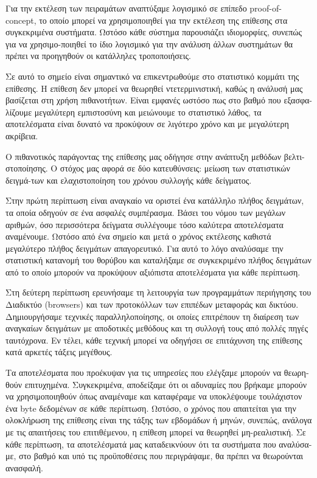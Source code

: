 Για την εκτέλεση των πειραμάτων αναπτύξαμε λογισμικό σε επίπεδο
proof-of-concept, το οποίο μπορεί να χρησιμοποιηθεί για την εκτέλεση της
επίθεσης στα συγκεκριμένα συστήματα. Ωστόσο κάθε σύστημα παρουσιάζει
ιδιομορφίες, συνεπώς για να χρησιμο-ποιηθεί το ίδιο λογισμικό για την ανάλυση
άλλων συστημάτων θα πρέπει να προηγηθούν οι κατάλληλες τροποποιήσεις.

Σε αυτό το σημείο είναι σημαντικό να επικεντρωθούμε στο στατιστικό κομμάτι της
επίθεσης. Η επίθεση δεν μπορεί να θεωρηθεί ντετερμινιστική, καθώς η ανάλυσή μας
βασίζεται στη χρήση πιθανοτήτων. Είναι εμφανές ωστόσο πως στο βαθμό που
εξασφα-λίζουμε μεγαλύτερη εμπιστοσύνη και μειώνουμε το στατιστικό λάθος, τα
αποτελέσματα είναι δυνατό να προκύψουν σε λιγότερο χρόνο και με μεγαλύτερη
ακρίβεια.

Ο πιθανοτικός παράγοντας της επίθεσης μας οδήγησε στην ανάπτυξη μεθόδων
βελτι-στοποίησης. Ο στόχος μας αφορά σε δύο κατευθύνσεις: μείωση των στατιστικών
δειγμά-των και ελαχιστοποίηση του χρόνου συλλογής κάθε δείγματος.

Στην πρώτη περίπτωση είναι αναγκαίο να οριστεί ένα κατάλληλο πλήθος δειγμάτων,
τα οποία οδηγούν σε ένα ασφαλές συμπέρασμα. Βάσει του νόμου των μεγάλων αριθμών,
όσο περισσότερα δείγματα συλλέγουμε τόσο καλύτερα αποτελέσματα αναμένουμε.
Ωστόσο από ένα σημείο και μετά ο χρόνος εκτέλεσης καθιστά μεγαλύτερο πλήθος
δειγμάτων απαγορευτικό. Για αυτό το λόγο αναλύσαμε την στατιστική κατανομή του
θορύβου και καταλήξαμε σε συγκεκριμένο πλήθος δειγμάτων από το οποίο μπορούν να
προκύψουν αξιόπιστα αποτελέσματα για κάθε περίπτωση.

Στη δεύτερη περίπτωση ερευνήσαμε τη λειτουργία των προγραμμάτων περιήγησης του
Διαδικτύο (browsers) και των προτοκόλλων των επιπέδων μεταφοράς και δικτύου.
Δημιουργήσαμε τεχνικές παραλληλοποίησης, οι οποίες επιτρέπουν τη διαίρεση των
αναγκαίων δειγμάτων με αποδοτικές μεθόδους και τη συλλογή τους από πολλές πηγές
ταυτόχρονα. Εν τέλει, κάθε τεχνική μπορεί να οδηγήσει σε επιτάχυνση της επίθεσης
κατά αρκετές τάξεις μεγέθους.

Τα αποτελέσματα που προέκυψαν για τις υπηρεσίες που ελέγξαμε μπορούν να
θεωρη-θούν επιτυχημένα. Συγκεκριμένα, αποδείξαμε ότι οι αδυναμίες που βρήκαμε
μπορούν να χρησιμοποιηθούν όπως αναμέναμε και καταφέραμε να υποκλέψουμε
τουλάχιστον ένα byte δεδομένων σε κάθε περίπτωση. Ωστόσο, ο χρόνος που
απαιτείται για την ολοκλήρωση της επίθεσης είναι της τάξης των εβδομάδων ή
μηνών, συνεπώς, ανάλογα με τις απαιτήσεις του επιτιθέμενου, η επίθεση μπορεί να
θεωρηθεί μη-ρεαλιστική. Σε κάθε περίπτωση, τα αποτελέσματά μας καταδεικνύουν ότι
τα συστήματα που αναλύσα-με, στο βαθμό και υπό τις προϋποθέσεις που περιγράψαμε,
θα πρέπει να θεωρούνται ανασφαλή.

